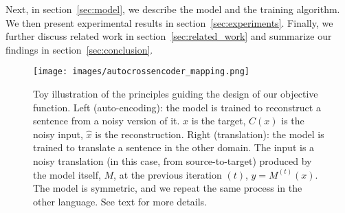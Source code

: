 Next, in section~\ref{sec:model}, we describe the model and the training algorithm. We then present experimental results in section~\ref{sec:experiments}. Finally, we further discuss related work in section~\ref{sec:related_work} and summarize our findings in section~\ref{sec:conclusion}.

\begin{figure}[!t]
\begin{center}
\texttt{[image: images/autocrossencoder\_mapping.png]}
\end{center}
\caption{Toy illustration of the principles guiding the design of our objective function. Left (auto-encoding): the model is trained to reconstruct a sentence from a noisy version of it. $x$ is the target, $C(x)$ is the noisy input, $\hat{x}$ is the reconstruction.
 Right (translation): the model is trained to translate a sentence in the other domain. The input is a noisy translation (in this case, from  source-to-target) produced by the model itself, $M$, at the previous iteration $(t)$, $y=M^{(t)}(x)$. The model is symmetric, and we repeat the same process in the other language.  See text for more details.}
\label{fig:model_outline2}
\end{figure}

